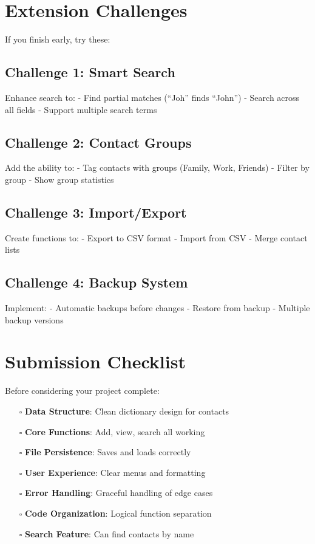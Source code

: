 \documentclass[
  letterpaper,
  DIV=11,
  numbers=noendperiod,
  oneside]{scrreprt}
\providecommand{\tightlist}{%
  \setlength{\itemsep}{0pt}\setlength{\parskip}{0pt}}\usepackage{longtable,booktabs,array}
\begin{document}
\section{Extension Challenges}\label{extension-challenges-5}

If you finish early, try these:

\subsection{Challenge 1: Smart Search}\label{challenge-1-smart-search}

Enhance search to: - Find partial matches (``Joh'' finds ``John'') -
Search across all fields - Support multiple search terms

\subsection{Challenge 2: Contact
Groups}\label{challenge-2-contact-groups}

Add the ability to: - Tag contacts with groups (Family, Work, Friends) -
Filter by group - Show group statistics

\subsection{Challenge 3: Import/Export}\label{challenge-3-importexport}

Create functions to: - Export to CSV format - Import from CSV - Merge
contact lists

\subsection{Challenge 4: Backup System}\label{challenge-4-backup-system}

Implement: - Automatic backups before changes - Restore from backup -
Multiple backup versions

\section{Submission Checklist}\label{submission-checklist-5}

Before considering your project complete:

\begin{itemize}
\tightlist
\item[$\square$]
  \textbf{Data Structure}: Clean dictionary design for contacts
\item[$\square$]
  \textbf{Core Functions}: Add, view, search all working
\item[$\square$]
  \textbf{File Persistence}: Saves and loads correctly
\item[$\square$]
  \textbf{User Experience}: Clear menus and formatting
\item[$\square$]
  \textbf{Error Handling}: Graceful handling of edge cases
\item[$\square$]
  \textbf{Code Organization}: Logical function separation
\item[$\square$]
  \textbf{Search Feature}: Can find contacts by name
\end{itemize}
\end{document}
